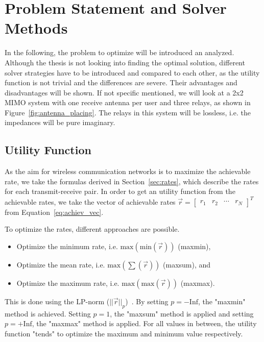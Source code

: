 \chapter{Problem Statement and Solver Methods}
\label{sec:solver}

In the following, the problem to optimize will be introduced an analyzed.
Although the thesis is not looking into finding the optimal solution, different solver strategies have to be introduced and compared to each other, as the utility function is not trivial and the differences are severe.
Their advantages and disadvantages will be shown.
If not specific mentioned, we will look at a 2x2 MIMO system with one receive antenna per user and three relays, as shown in Figure~\ref{fig:antenna_placing}.
The relays in this system will be lossless, i.e. the impedances will be pure imaginary.

\section{Utility Function}
\label{sec:utility_function}
As the aim for wireless communication networks is to maximize the achievable rate, we take the formulas derived in Section~\ref{sec:rates}, which describe the rates for each transmit-receive pair.
In order to get an utility function from the achievable rates, we take the vector of achievable rates $\vec{r} = \begin{bmatrix}
r_1 & r_2 & \cdots & r_N
\end{bmatrix}^T$ from Equation~\eqref{eq:achiev_vec}.

To optimize the rates, different approaches are possible.
\begin{itemize}
\item Optimize the minimum rate, i.e. $\text{max}\left(\text{min}(\vec{r})\right)$ (maxmin),
\item Optimize the mean rate, i.e. $\text{max}\left(\sum(\vec{r})\right)$ (maxsum), and
\item Optimize the maximum rate, i.e. $\text{max}\left(\text{max}(\vec{r})\right)$ (maxmax).
\end{itemize}

This is done using the LP-norm ($||\vec{r}||_p$)~\cite[p.853]{Kreyszig}.
By setting $p = -\text{Inf}$, the "maxmin" method is achieved.
Setting $p = 1$, the "maxsum" method is applied and setting $p = +\text{Inf}$, the "maxmax" method is applied.
For all values in between, the utility function "tends" to optimize the maximum and minimum value respectively.

